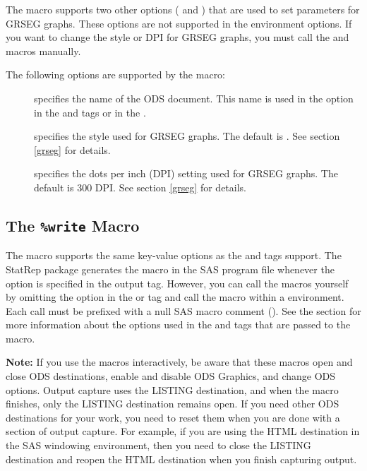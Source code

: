 \documentclass[article,oneside]{memoir}
\newcommand*{\StatRep}{\textsf{StatRep}\xspace}
\begin{document}
  The  macro supports two other options ( and ) that are used to
  set parameters for GRSEG graphs. These options are not supported in the
   environment options. If you want to change the style or DPI for
  GRSEG graphs, you must call the  and  macros manually.

  The following options are supported by the  macro:
 \begin{description}
 \item[] specifies the name of the ODS document.
  This name is used in the  option in the  and  tags
  or in the .

 \item[] specifies the style used for GRSEG graphs.
 The default is . See section \ref{grseg} for details.

 \item[] specifies the dots per inch (DPI) setting used for GRSEG graphs.
  The default is 300 DPI. See section \ref{grseg} for details.
 \end{description}


  \subsection{The \texttt{\%write} Macro}
  The  macro supports the same key-value options as the  and
   tags support.
  The \StatRep package generates the  macro in the SAS program
  file whenever the  option is specified in the output tag.
  However, you can call the macros
  yourself by omitting the  option in the  or 
  tag and call the macro within a  environment. Each call must be prefixed
  with a null SAS macro comment (\Code{\%*;}).
See the section  for more information about the options used in the
 and  tags that are passed to the  macro.


\vspace*{1em}\noindent\textbf{Note:} If you use the macros interactively, be aware that
these macros open and close ODS destinations,
enable and disable ODS Graphics, and change ODS options.  Output capture uses the
LISTING destination, and when the  macro finishes, only the
LISTING destination remains open.
If you need other ODS destinations for your work, you need to reset them
when you are done with a section of output capture.  For example,
if you are using the HTML destination
in the SAS windowing environment, then you need to
close the LISTING destination and reopen the HTML destination when you finish
capturing output.
\end{document}
